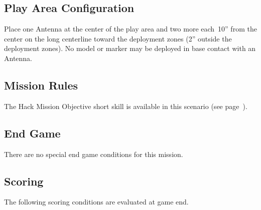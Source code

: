 \label{mission:seizetheantennas}

\subsection{Play Area Configuration}

Place one Antenna at the center of the play area and two more
each~10'' from the center on the long centerline toward the deployment
zones (2'' outside the deployment zones).  No model or marker may be
deployed in base contact with an Antenna.


\subsection{Mission Rules}

The Hack Mission Objective short skill is available in this scenario
(see page~\pageref{sec:hack-objective}).

\subsection{End Game}

There are no special end game conditions for this mission.

\subsection{Scoring}

The following scoring conditions are evaluated at game end.

